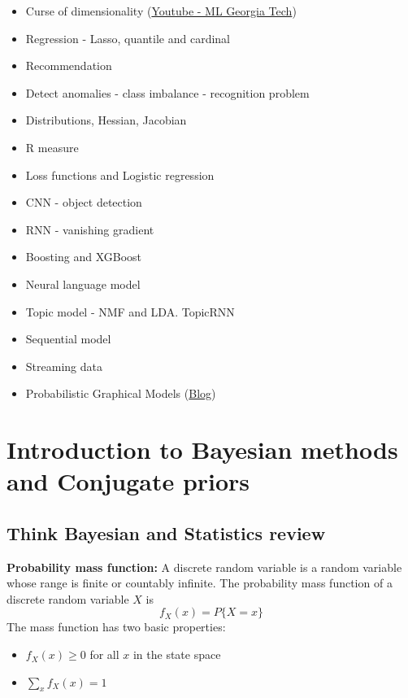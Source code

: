 \documentclass{book}
\begin{document}
\begin{itemize}
\item Curse of dimensionality (\href{https://www.youtube.com/watch?v=5yzSv4jYMyI&list=PLgIPpm6tJZoShjm7r8Npia7CMsMlRWeuZ}{Youtube - ML Georgia Tech})
\item Regression - Lasso, quantile and cardinal
\item Recommendation
\item Detect anomalies - class imbalance - recognition problem 
\item Distributions, Hessian, Jacobian
\item R measure
\item Loss functions and Logistic regression
\item CNN - object detection
\item RNN - vanishing gradient
\item Boosting and XGBoost
\item Neural language model
\item Topic model - NMF and LDA. TopicRNN
\item Sequential model
\item Streaming data
\item Probabilistic Graphical Models (\href{https://medium.com/@neerajsharma_28983/intuitive-guide-to-probability-graphical-models-be81150da7a}{Blog})
\end{itemize}


\chapter{Introduction to Bayesian methods and Conjugate priors}

\section{Think Bayesian and Statistics review}

\noindent
\textbf{Probability mass function:} 
A discrete random variable is a random variable whose range is finite or countably infinite. The probability mass function of a discrete random variable $X$ is 
\[ f_X(x) = P\{X=x\}\]
The mass function has two basic properties:
\begin{itemize}
\item $f_X(x) \geq 0$ for all $x$ in the state space
\item $\sum_x f_X(x) = 1$
\end{itemize}
\end{document}
